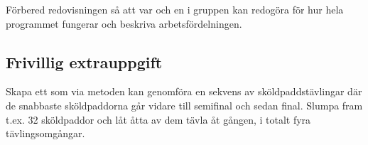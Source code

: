 %
%

\Task Förbered redovisningen så att var och en i gruppen kan redogöra för hur hela programmet fungerar och beskriva arbetsfördelningen.

\subsection{Frivillig extrauppgift}

\Task Skapa ett  som via metoden  kan genomföra en sekvens av sköldpaddstävlingar där de snabbaste sköldpaddorna går vidare till semifinal och sedan final. Slumpa fram t.ex. 32 sköldpaddor och låt åtta av dem tävla åt gången, i totalt fyra tävlingsomgångar.

